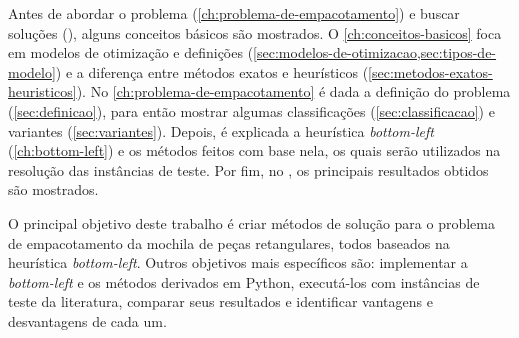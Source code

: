 Antes de abordar o problema (\autoref{ch:problema-de-empacotamento}) e buscar soluções
(), alguns conceitos básicos são mostrados.
O \autoref{ch:conceitos-basicos} foca em modelos de otimização e definições
(\cref{sec:modelos-de-otimizacao,sec:tipos-de-modelo}) e a diferença entre métodos exatos e
heurísticos (\cref{sec:metodos-exatos-heuristicos}).
No \autoref{ch:problema-de-empacotamento} é dada a definição do problema (\autoref{sec:definicao}),
para então mostrar algumas classificações (\autoref{sec:classificacao}) e variantes
(\autoref{sec:variantes}).
Depois, é explicada a heurística \textit{bottom-left} (\autoref{ch:bottom-left}) e os métodos feitos
com base nela, os quais serão utilizados na resolução das instâncias de teste.
Por fim, no , os principais resultados obtidos são mostrados.

O principal objetivo deste trabalho é criar métodos de solução para o problema de
empacotamento da mochila de peças retangulares, todos baseados na heurística \textit{bottom-left}.
Outros objetivos mais específicos são: implementar a \textit{bottom-left} e os métodos derivados em
Python, executá-los com instâncias de teste da literatura, comparar seus resultados e identificar
vantagens e desvantagens de cada um.
